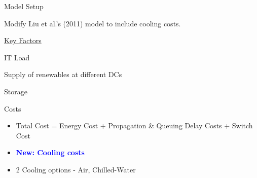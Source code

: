 \documentclass[xcolor=dvipsnames]{beamer}
\newcommand{\bi}{\begin{itemize}}
\newcommand{\ei}{\end{itemize}}
\newcommand{\itm}{\item}
\begin{document}
\begin{frame}{Model Setup}

Modify Liu et al.'s (2011) %
model to include cooling costs.

\vspace{3mm}
\begin{block}{\underline{Key Factors}}
\end{block}
\vspace{-2mm}
	
\begin{block}{IT Load}
\end{block}
\vspace{-2mm}

 \begin{block}{Supply of renewables at different DCs}
\end{block}
\vspace{-2mm}

\begin{block}{Storage}
\end{block}
\vspace{-2mm}

\begin{block}{Costs} 
	\bi
		\itm Total Cost = Energy Cost + Propagation \& Queuing Delay Costs + Switch Cost
		\itm {\bf \textcolor{blue}{New: Cooling costs}}
		\itm 2 Cooling options - Air, Chilled-Water 
	\ei
\end{block}

\end{frame}
\end{document}
